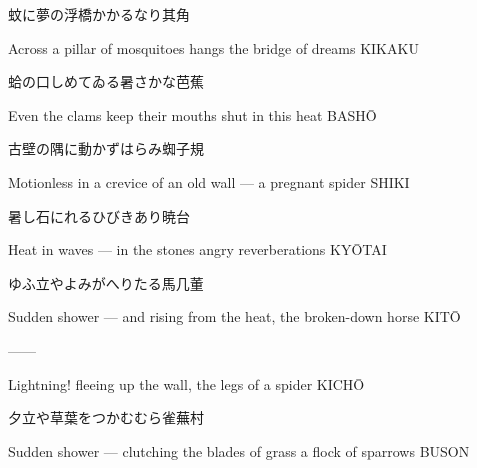 \begin{haiku}
    {\FH 蚊に夢の浮橋かかるなり}\hfill{\FH 其角}

    \vin{} Across a pillar of mosquitoes
    \vin{} \vin{} hangs the bridge
    \vin{} \vin{} \vin{} of dreams \hspace{\fill} KIKAKU
\end{haiku}

\begin{haiku}
    {\FH 蛤の口しめてゐる暑さかな}\hfill{\FH 芭蕉}

    \vin{} Even the clams
    \vin{} \vin{} keep their mouths shut
    \vin{} \vin{} \vin{} in this heat \hspace{\fill} BASH\={O}
\end{haiku}

\begin{haiku}
    {\FH 古壁の隅に動かずはらみ蜘}\hfill{\FH 子規}

    \vin{} Motionless
    \vin{} \vin{} in a crevice of an old wall ---
    \vin{} \vin{} \vin{} a pregnant spider \hspace{\fill} SHIKI
\end{haiku}

\begin{haiku}
    {\FH {}暑し石にれるひびきあり}\hfill{\FH 暁台}

    \vin{} Heat in waves ---
    \vin{} \vin{} in the stones
    \vin{} \vin{} \vin{} angry reverberations \hspace{\fill} KY\={O}TAI
\end{haiku}

\begin{haiku}
    {\FH ゆふ立やよみがへりたる馬}\hfill{\FH 几董}

    \vin{} Sudden shower ---
    \vin{} \vin{} and rising from the heat,
    \vin{} \vin{} \vin{} the broken-down horse \hspace{\fill} KIT\={O}
\end{haiku}

\begin{haiku}
    ---\hfill{---}

    \vin{} Lightning!
    \vin{} \vin{} fleeing up the wall,
    \vin{} \vin{} \vin{} the legs of a spider \hspace{\fill} KICH\={O}
\end{haiku}

\begin{haiku}
    {\FH 夕立や草葉をつかむむら雀}\hfill{\FH 蕪村}

    \vin{} Sudden shower ---
    \vin{} \vin{} clutching the blades of grass
    \vin{} \vin{} \vin{} a flock of sparrows \hspace{\fill} BUSON
\end{haiku}

